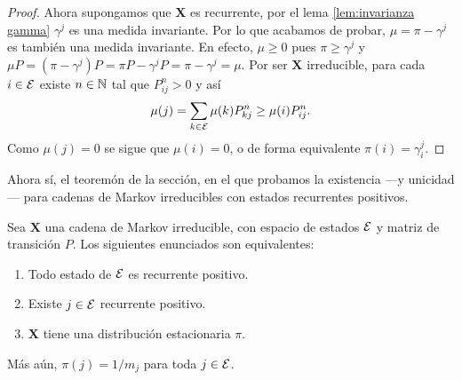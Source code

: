\begin{proof}
    Ahora supongamos que $\bm X$ es recurrente, por el lema \ref{lem:invarianza gamma} $\gamma^j$ es una medida invariante. Por lo que acabamos de probar, $\mu = \pi - \gamma^j$ es también una medida invariante. En efecto, $\mu \geq 0$ pues $\pi \geq \gamma^j$ y $\mu P = (\pi - \gamma^j) P = \pi P - \gamma^j P = \pi - \gamma^j = \mu$. Por ser $\bm X$ irreducible, para cada $i \in \mathcal{E}$ existe $n \in \mathbb{N}$ tal que $P_{ij}^n > 0$ y así 
    \[
        \mu(j) = \sum_{k \in \mathcal{E}} \mu(k) P_{kj}^n \geq \mu(i) P_{ij}^n.
    \]
    Como $\mu(j) = 0$ se sigue que $\mu(i) = 0$, o de forma equivalente $\pi(i) = \gamma_i^j$.
\end{proof}

Ahora sí, el teoremón de la sección, en el que probamos la existencia ---y unicidad--- para cadenas de Markov irreducibles con estados recurrentes positivos.

\begin{theorem}\label{teo:existencia distribucion estacionaria}
    Sea $\bm X$ una cadena de Markov irreducible, con espacio de estados $\mathcal{E}$ y matriz de transición $P$. Los siguientes enunciados son equivalentes:
    \begin{enumerate}
        \item Todo estado de $\mathcal{E}$ es recurrente positivo.
        \item Existe $j \in \mathcal{E}$ recurrente positivo.
        \item $\bm X$ tiene una distribución estacionaria $\pi$. 
    \end{enumerate}
    Más aún, $\pi(j) = 1/m_j$ para toda $j \in \mathcal{E}$.
\end{theorem}

